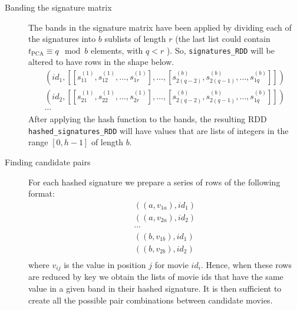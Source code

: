 \begin{description}
    \item [Banding the signature matrix] The bands in the signature matrix have been applied by dividing each of the signatures into $b$ sublists of length $r$ (the last list could contain ${t_\text{PCA}\equiv q\mod b}$ elements, with $q < r$ ). So, \texttt{signatures\_RDD} will be altered to have rows in the shape below.
        $$\begin{array}{c}
            (id_1, [[s_{11}^{(1)}, s_{12}^{(1)}, \dots, s_{1r}^{(1)}], \dots, [s_{2(q-2)}^{(b)},s_{2(q-1)}^{(b)},\dots,s_{1q}^{(b)}]])\\
            (id_2, [[s_{21}^{(1)}, s_{22}^{(1)}, \dots, s_{2r}^{(1)}], \dots, [s_{2(q-2)}^{(b)},s_{2(q-1)}^{(b)},\dots,s_{1q}^{(b)}]])\\
            \cdots       
        \end{array}$$
    After applying the hash function to the bands, the resulting RDD \texttt{hashed\_signatures\_RDD} will have values that are lists of integers in the range $[0,h-1]$ of length $b$.

    \item [Finding candidate pairs] For each hashed signature we prepare a series of rows of the following format:
        $$\begin{array}{c}
            ((a, v_{1a}), id_1)\\
            ((a, v_{2a}), id_2)\\
            \cdots\\
            ((b, v_{1b}), id_1)\\
            ((b, v_{2b}), id_2)\\
        \end{array}$$
    where $v_{ij}$ is the value in position $j$ for movie $id_i$. Hence, when these rows are reduced by key we obtain the lists of movie ids that have the same value in a given band in their hashed signature. It is then sufficient to create all the possible pair combinations between candidate movies. 
    

\end{description}
